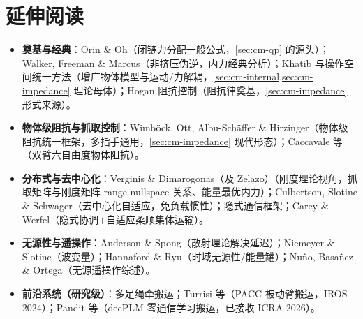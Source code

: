 \section*{延伸阅读}
\begin{itemize}
  \item \textbf{奠基与经典}：Orin \& Oh\cite{orin1986force}（闭链力分配一般公式，\cref{sec:cm-qp} 的源头）；Walker, Freeman \& Marcus\cite{walker1988internal}（非挤压伪逆，内力经典分析）；Khatib\cite{khatib1988object} 与操作空间统一方法\cite{khatib1987operational}（增广物体模型与运动/力解耦，\cref{sec:cm-internal,sec:cm-impedance} 理论母体）；Hogan 阻抗控制\cite{hogan1985impedance}（阻抗律奠基，\cref{sec:cm-impedance} 形式来源）。
  \item \textbf{物体级阻抗与抓取控制}：Wimb\"ock, Ott, Albu-Sch\"affer \& Hirzinger\cite{wimbock2012comparison}（物体级阻抗统一框架，多指手通用，\cref{sec:cm-impedance} 现代形态）；Caccavale 等\cite{caccavale2008six}（双臂六自由度物体阻抗）。
  \item \textbf{分布式与去中心化}：Verginis \& Dimarogonas（及 Zelazo）\cite{verginis2019cooperative}（刚度理论视角，抓取矩阵与刚度矩阵 range-nullspace 关系、能量最优内力）；Culbertson, Slotine \& Schwager\cite{culbertson2021decentralized}（去中心化自适应，免负载惯性）；隐式通信框架\cite{wang2018collaborative}；Carey \& Werfel\cite{carey2021collective}（隐式协调$+$自适应柔顺集体运输）。
  \item \textbf{无源性与遥操作}：Anderson \& Spong\cite{anderson1989bilateral}（散射理论解决延迟）；Niemeyer \& Slotine\cite{niemeyer1991stable}（波变量）；Hannaford \& Ryu\cite{hannaford2002time}（时域无源性/能量罐）；Nu\~no, Basa\~nez \& Ortega\cite{nuno2011passivity}（无源遥操作综述）。
  \item \textbf{前沿系统（研究级）}：多足绳牵搬运\cite{sombolestan2022collaborative}；Turrisi 等\cite{turrisi2024pacc}（PACC 被动臂搬运，IROS 2024）；Pandit 等\cite{pandit2025decplm}（decPLM 零通信学习搬运，已接收 ICRA 2026）。
\end{itemize}

